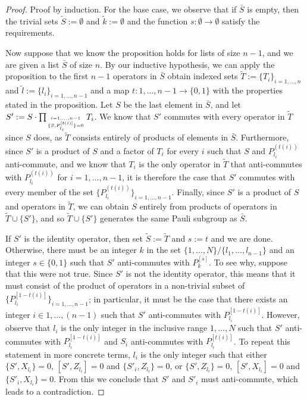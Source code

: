 \documentclass[twocolumn,showpacs,preprintnumbers,amsmath,amssymb,nofootinbib,pra,floatfix]{revtex4}
\newcommand{\lst}{\bar}
\newcommand{\set}{\tilde}
\begin{document}
\begin{proof}
Proof by induction.  For the base case, we observe that if $\lst S$ is empty, then the trivial sets $\set S:=\emptyset$ and $\set k :=\emptyset$ and the function $s:\emptyset\to\emptyset$ satisfy the requirements.

Now suppose that we know the proposition holds for lists of size $n-1$, and we are given a list $\lst S$ of size $n$.  By our inductive hypothesis, we can apply the proposition to the first $n-1$ operators in $\lst S$ obtain indexed sets $\set T:=\{T_i\}_{i=1,\dots,n}$ and $\set l := \{l_i\}_{i=1,\dots,n-1}$ and a map $t:1,\dots,n-1\to \{0,1\}$ with the properties stated in the proposition.  Let $S$ be the last element in $\lst S$, and let $S':=S\cdot \prod_{i=1,\dots,n-1 \atop \{S,P_{l_i}^{[t(i)]}\}=0} T_i$.  We know that $S'$ commutes with every operator in $\set T$ since $S$ does, as $\set T$ consists entirely of products of elements in $\lst S$.  Furthermore, since $S'$ is a product of $S$ and a factor of $T_i$ for every $i$ such that $S$ and $P_{l_i}^{(t(i))}$ anti-commute, and we know that $T_i$ is the only operator in $\set T$ that anti-commutes with $P_{l_i}^{(t(i))}$ for $i=1,\dots,n-1$, it is therefore the case that $S'$ commutes with every member of the set $\{P_{l_i}^{(t(i))}\}_{i=1,\dots,n-1}$.  Finally, since $S'$ is a product of $S$ and operators in $\set T$, we can obtain $S$ entirely from products of operators in $\set T \cup \{S'\}$, and so $\set T \cup \{S'\}$ generates the same Pauli subgroup as $\lst S$.

If $S'$ is the identity operator, then set $\set S:=\set T$ and $s:=t$ and we are done.  Otherwise, there must be an integer $k$ in the set $\{1,\dots,N\}\slash\{l_1,\dots,l_{n-1}\}$ and an integer $s\in\{0,1\}$ such that $S'$ anti-commutes with $P_k^{[s]}$.  To see why, suppose that this were not true.  Since $S'$ is not the identity operator, this means that it must consist of the product of operators in a non-trivial subset of $\{P_{l_i}^{[1-t(i)]}\}_{i=1,\dots,n-1}$;  in particular, it must be the case that there exists an integer $i\in 1,\dots,(n-1)$ such that $S'$ anti-commutes with $P_{l_i}^{[1-t(i)]}$.  However, observe that $l_i$ is the only integer in the inclusive range $1,\dots, N$ such that $S'$ anti-commutes with $P_{l_i}^{[1-t(i)]}$ and $S_i$ anti-commutes with $P_{l_i}^{[t(i)]}$.  To repeat this statement in more concrete terms, $l_i$ is the only integer such that either $\{S',X_{l_i}\}=0$, $[S',Z_{l_i}]=0$ and $\{S'_i,Z_{l_i}\}=0$, or $\{S',Z_{l_i}\}=0$, $[S',X_{l_i}]=0$ and $\{S'_i,X_{l_i}\}=0$.  From this we conclude that $S'$ and $S'_i$ must anti-commute, which leads to a contradiction.


\end{proof}
\end{document}
